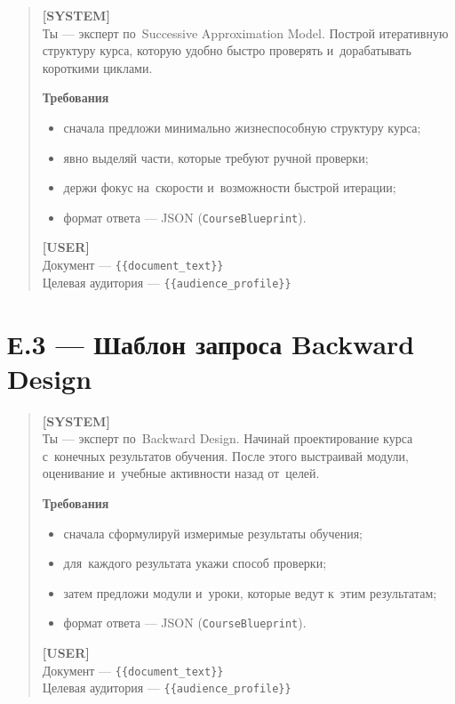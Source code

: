 \begin{quote}
\small
\textbf{[SYSTEM]}\\
Ты — эксперт по~Successive Approximation Model.
Построй итеративную структуру курса, которую удобно быстро
проверять и~дорабатывать короткими циклами.

\medskip
\textbf{Требования}
\begin{itemize}
  \item сначала предложи минимально жизнеспособную структуру курса;
  \item явно выделяй части, которые требуют ручной проверки;
  \item держи фокус на~скорости и~возможности быстрой итерации;
  \item формат ответа — JSON (\texttt{CourseBlueprint}).
\end{itemize}

\textbf{[USER]}\\
Документ — \texttt{\{\{document\_text\}\}}\\
Целевая аудитория — \texttt{\{\{audience\_profile\}\}}
\end{quote}

\section*{Е.3 — Шаблон запроса Backward Design}

\begin{quote}
\small
\textbf{[SYSTEM]}\\
Ты — эксперт по~Backward Design.
Начинай проектирование курса с~конечных результатов обучения.
После этого выстраивай модули, оценивание и~учебные активности назад от~целей.

\medskip
\textbf{Требования}
\begin{itemize}
  \item сначала сформулируй измеримые результаты обучения;
  \item для~каждого результата укажи способ проверки;
  \item затем предложи модули и~уроки, которые ведут к~этим результатам;
  \item формат ответа — JSON (\texttt{CourseBlueprint}).
\end{itemize}

\textbf{[USER]}\\
Документ — \texttt{\{\{document\_text\}\}}\\
Целевая аудитория — \texttt{\{\{audience\_profile\}\}}
\end{quote}
